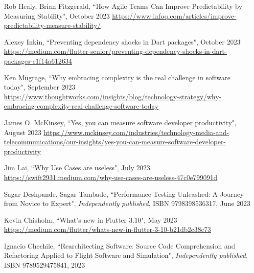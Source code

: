 \begin{thebibliography}{100}

 Rob Healy, Brian Fitzgerald, ``How Agile Teams Can Improve Predictability by Measuring 
Stability", October 2023 
\href{https://www.infoq.com/articles/improve-predictability-measure-stability/}{https://www.infoq.com/articles/improve-predictability-measure-stability/}

 Alexey Inkin, ``Preventing dependency shocks in Dart packages", October 2023
\href{https://medium.com/flutter-senior/preventing-dependency-shocks-in-dart-packages-c1f14a612634}{https://medium.com/flutter-senior/preventing-dependency-shocks-in-dart-packages-c1f14a612634}

 Ken Mugrage, ``Why embracing complexity is the real challenge in software today", September 2023 
\href{https://www.thoughtworks.com/insights/blog/technology-strategy/why-embracing-complexity-real-challenge-software-today}{https://www.thoughtworks.com/insights/blog/technology-strategy/why-embracing-complexity-real-challenge-software-today}

 James O. McKinsey, ``Yes, you can measure software developer productivity", August 2023
\href{https://www.mckinsey.com/industries/technology-media-and-telecommunications/our-insights/yes-you-can-measure-software-developer-productivity}{https://www.mckinsey.com/industries/technology-media-and-telecommunications/our-insights/yes-you-can-measure-software-developer-productivity}

 Jim Lai, ``Why Use Cases are useless", July 2023
\href{https://swift2931.medium.com/why-use-cases-are-useless-47c0e799091d}{https://swift2931.medium.com/why-use-cases-are-useless-47c0e799091d}

 Sagar Deshpande, Sagar Tambade, ``Performance Testing Unleashed: A Journey from Novice to Expert", 
\emph{Independently published}, ISBN 9798398536317, June 2023

 Kevin Chisholm, ``What's new in Flutter 3.10", May 2023
\href{https://medium.com/flutter/whats-new-in-flutter-3-10-b21db2c38c73}{https://medium.com/flutter/whats-new-in-flutter-3-10-b21db2c38c73}

 Ignacio Chechile, ``Rearchitecting Software: Source Code Comprehension and Refactoring 
Applied to Flight Software and Simulation", \emph{Independently published}, ISBN 9789529475841, 2023


\end{thebibliography}
